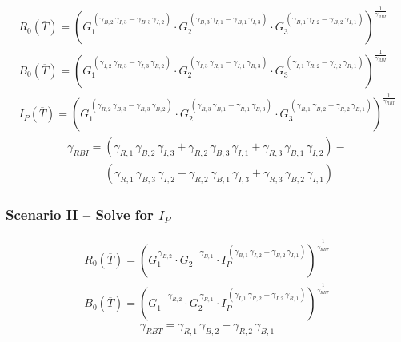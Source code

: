 \begin{gather}
	\label{eq:case_1_R}
	R_0( \overline T) = \left(
	G_1 ^ {  \, ( \gamma_{B,2} \, \gamma_{I,3} - \gamma_{B,3} \, \gamma_{I,2} ) } \cdot
	G_2 ^ {  \, ( \gamma_{B,3} \, \gamma_{I,1} - \gamma_{B,1} \, \gamma_{I,3} ) } \cdot
	G_3 ^ {  \, ( \gamma_{B,1} \, \gamma_{I,2} - \gamma_{B,2} \, \gamma_{I,1} ) }\right)^{ \frac{1}{\gamma_{RBI}} } \\
	\label{eq:case_1_B}
	B_0( \overline T) = \left(
	G_1 ^ {  \, ( \gamma_{I,2} \, \gamma_{R,3} - \gamma_{I,3} \, \gamma_{R,2} ) } \cdot
	G_2 ^ {  \, ( \gamma_{I,3} \, \gamma_{R,1} - \gamma_{I,1} \, \gamma_{R,3} ) } \cdot
	G_3 ^ {  \, ( \gamma_{I,1} \, \gamma_{R,2} - \gamma_{I,2} \, \gamma_{R,1} ) }\right)^{ \frac{1}{\gamma_{RBI}} } \\
	\label{eq:case_1_I}
	I_P( \overline T) = \left(
	G_1 ^ {  \, ( \gamma_{R,2} \, \gamma_{B,3} - \gamma_{R,3} \, \gamma_{B,2} ) } \cdot
	G_2 ^ {  \, ( \gamma_{R,3} \, \gamma_{B,1} - \gamma_{R,1} \, \gamma_{B,3} ) } \cdot
	G_3 ^ {  \, ( \gamma_{R,1} \, \gamma_{B,2} - \gamma_{R,2} \, \gamma_{B,1} ) }\right)^{ \frac{1}{\gamma_{RBI}} }
\end{gather}
\begin{gather}
	\label{eq:case_1_gamma}
	\gamma_{RBI} = ( \gamma_{R,1} \, \gamma_{B,2} \, \gamma_{I,3} +  \gamma_{R,2} \, \gamma_{B,3} \, \gamma_{I,1} + \gamma_{R,3} \, \gamma_{B,1} \, \gamma_{I,2} ) - \\
	\ \ \ \ \ \ \ \ \ \ \ \ \ \ \ ( \gamma_{R,1} \, \gamma_{B,3} \, \gamma_{I,2} +  \gamma_{R,2} \, \gamma_{B,1} \, \gamma_{I,3} + \gamma_{R,3} \, \gamma_{B,2} \, \gamma_{I,1} ) \nonumber
\end{gather}

\subsubsection{Scenario II -- Solve for $I_P$}

\begin{gather}
	\label{eq:case_2_R}
	R_0( \overline T) = \left(
	G_1 ^ {  \, \gamma_{B,2} } \cdot
	G_2 ^ {  \, -\gamma_{B,1} } \cdot
	I_P ^ {  \, ( \gamma_{B,1} \, \gamma_{I,2} - \gamma_{B,2} \, \gamma_{I,1} ) }\right)^{ \frac{1}{\gamma_{RBT}} } \\
	\label{eq:case_2_B}
	B_0( \overline T) = \left(
	G_1 ^ {  \, -\gamma_{R,2} } \cdot
	G_2 ^ {  \, \gamma_{R,1} } \cdot
	I_P ^ {  \, ( \gamma_{I,1} \, \gamma_{R,2} - \gamma_{I,2} \, \gamma_{R,1} ) }\right)^{ \frac{1}{\gamma_{RBT}} }
\end{gather}
\begin{equation}
	\label{eq:case_2_gamma}
	\gamma_{RBT} = \gamma_{R,1} \, \gamma_{B,2} - \gamma_{R,2} \, \gamma_{B,1}
\end{equation}

